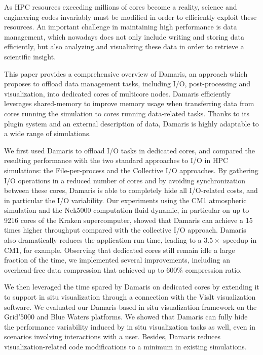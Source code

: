 As HPC resources exceeding millions of cores become a reality, science and engineering codes invariably
must be modified in order to efficiently exploit these resources. An important challenge in
maintaining high performance is data management, which nowadays does not only include writing
and storing data efficiently, but also analyzing and visualizing these data in order to retrieve a scientific insight.

This paper provides a comprehensive overview of Damaris, an approach which proposes to offload data management tasks,
including I/O, post-processing and visualization, into dedicated cores of multicore nodes. Damaris
efficiently leverages shared-memory to improve memory usage when transferring data from
cores running the simulation to cores running data-related tasks. Thanks to its plugin system and 
an external description of data, Damaris is highly adaptable to a wide range of simulations.

			We first used Damaris to offload I/O tasks in dedicated cores, and compared
			the resulting performance with the two standard approaches to I/O in HPC simulations:
			the File-per-process and the Collective I/O approaches. By gathering I/O operations
			in a reduced number of cores and by avoiding synchronization between these cores,
			Damaris is able to completely hide all I/O-related costs, and in particular the
			I/O variability. Our experiments using the CM1 atmospheric simulation and the Nek5000
			computation fluid dynamic, in particular on up to
			9216 cores of the Kraken supercomputer, showed that Damaris can achieve a 15 times
			higher throughput compared with the collective I/O approach. Damaris also dramatically
			reduces the application run time, leading to a $3.5\times$ speedup in CM1, for example.
			Observing that dedicated cores still remain idle a large fraction of the time,
			we implemented several improvements, including an overhead-free data compression
			that achieved up to 600\% compression ratio.
			
			We then leveraged the time spared by Damaris on dedicated cores by extending it 
			to support in situ visualization through a connection with the VisIt visualization software.
			We evaluated our Damaris-based in situ visualization framework on the Grid'5000 and Blue Waters platforms.
			We showed that Damaris can fully hide the performance variability induced 
			by in situ visualization tasks as well, even in scenarios involving interactions with a user. 
			Besides, Damaris reduces visualization-related code modifications 
			to a minimum in existing simulations.
			

